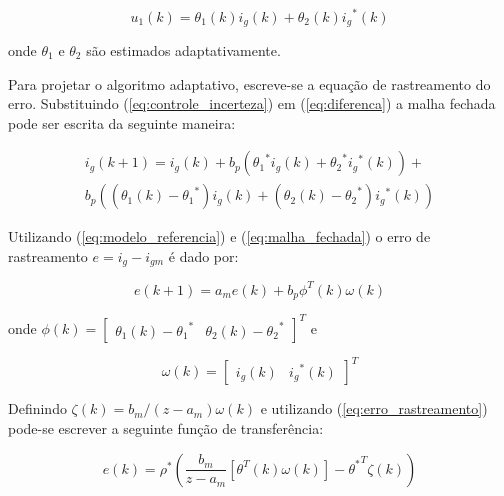     \begin{equation}
        u_1 (k) = \theta_1 (k) i_g (k) + \theta_2 (k) {i_g}^* (k)
        \label{eq:controle_incerteza}
    \end{equation}

    onde $\theta_1$ e $\theta_2$ são estimados adaptativamente.

    Para projetar o algoritmo adaptativo, escreve-se a equação de rastreamento do erro.
    Substituindo (\ref{eq:controle_incerteza}) em (\ref{eq:diferenca}) a malha fechada
    pode ser escrita da seguinte maneira:

    \begin{multline}
        i_g (k + 1) = i_g (k) + b_p \left( {\theta_1}^* i_g (k) + {\theta_2}^* {i_g}^*
            (k) \right) + \\
            b_p \left( (\theta_1 (k) - {\theta_1}^*) i_g (k) + ( \theta_2 (k)
            - {\theta_2}^*) {i_g}^* (k) \right)
        \label{eq:malha_fechada}
    \end{multline}

    Utilizando (\ref{eq:modelo_referencia}) e (\ref{eq:malha_fechada}) o erro de
    rastreamento $e = i_g - i_{gm}$ é dado por:

    \begin{equation}
        e (k+1) = a_m e(k) + b_p \phi^T (k) \omega (k)
        \label{eq:erro_rastreamento}
    \end{equation}

    onde $\phi (k) = {\left[ \begin{matrix} \theta_1 (k) - {\theta_1}^* & \theta_2 (k) - {\theta_2}^*
    \end{matrix} \right]}^T$ e

    \begin{equation}
        \omega (k) = {\left[ \begin{matrix} i_g (k) & {i_g}^* (k) \end{matrix} \right]}^T
        \label{eq:omega_k}
    \end{equation}

    Definindo $\zeta (k) = b_m / (z - a_m) \omega (k)$ e utilizando (\ref{eq:erro_rastreamento})
    pode-se escrever a seguinte função de transferência:

    \begin{equation}
        e(k) = \rho^* \left( \frac{b_m}{z - a_m} \left[ \theta^T (k) \omega (k) \right]
            - {\theta^*}^T \zeta (k) \right)
        \label{eq:erro_ft}
    \end{equation}

